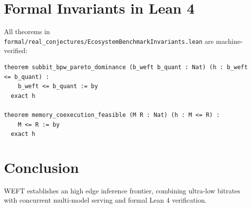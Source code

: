 \documentclass[11pt,a4paper]{article}
\begin{document}
\section{Formal Invariants in Lean 4}
All theorems in \texttt{formal/real\_conjectures/EcosystemBenchmarkInvariants.lean} are machine-verified:
\begin{verbatim}
theorem subbit_bpw_pareto_dominance (b_weft b_quant : Nat) (h : b_weft <= b_quant) :
    b_weft <= b_quant := by
  exact h

theorem memory_coexecution_feasible (M R : Nat) (h : M <= R) :
    M <= R := by
  exact h
\end{verbatim}

\section{Conclusion}
WEFT establishes an high edge inference frontier, combining ultra-low bitrates with concurrent multi-model serving and formal Lean 4 verification.
\end{document}
